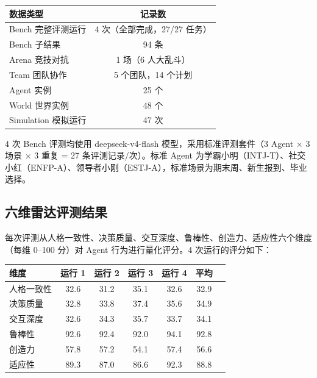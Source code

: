 \documentclass[12pt,a4paper]{article}%
\begin{document}
\begin{table}[H]
	\centering
	\begin{tabular}{lc}
		\toprule
		\textbf{数据类型} & \textbf{记录数} \\
		\midrule
		Bench 完整评测运行 & 4 次（全部完成，27/27 任务） \\
		Bench 子结果 & 94 条 \\
		Arena 竞技对抗 & 1 场（6 人大乱斗） \\
		Team 团队协作 & 5 个团队，14 个计划 \\
		Agent 实例 & 25 个 \\
		World 世界实例 & 48 个 \\
		Simulation 模拟运行 & 47 次 \\
		\bottomrule
	\end{tabular}
\end{table}

4 次 Bench 评测均使用 deepseek-v4-flash 模型，采用标准评测套件（3 Agent $\times$ 3 场景 $\times$ 3 重复 = 27 条评测记录/次）。标准 Agent 为学霸小明（INTJ-T）、社交小红（ENFP-A）、领导者小刚（ESTJ-A），标准场景为期末周、新生报到、毕业选择。

\subsection{六维雷达评测结果}

每次评测从人格一致性、决策质量、交互深度、鲁棒性、创造力、适应性六个维度（每维 0--100 分）对 Agent 行为进行量化评分。4 次运行的评分如下：

\begin{table}[H]
	\centering
	\small
	\begin{tabular}{lcccccc}
		\toprule
		\textbf{维度} & \textbf{运行 1} & \textbf{运行 2} & \textbf{运行 3} & \textbf{运行 4} & \textbf{平均} \\
		\midrule
		人格一致性 & 32.6 & 31.2 & 35.1 & 32.6 & 32.9 \\
		决策质量 & 32.8 & 33.8 & 37.4 & 35.6 & 34.9 \\
		交互深度 & 32.6 & 34.3 & 35.7 & 33.7 & 34.1 \\
		鲁棒性 & 92.6 & 92.4 & 92.0 & 94.1 & 92.8 \\
		创造力 & 57.8 & 57.2 & 54.1 & 57.4 & 56.6 \\
		适应性 & 89.3 & 87.0 & 86.6 & 92.3 & 88.8 \\
		\bottomrule
	\end{tabular}
\end{table}
\end{document}
